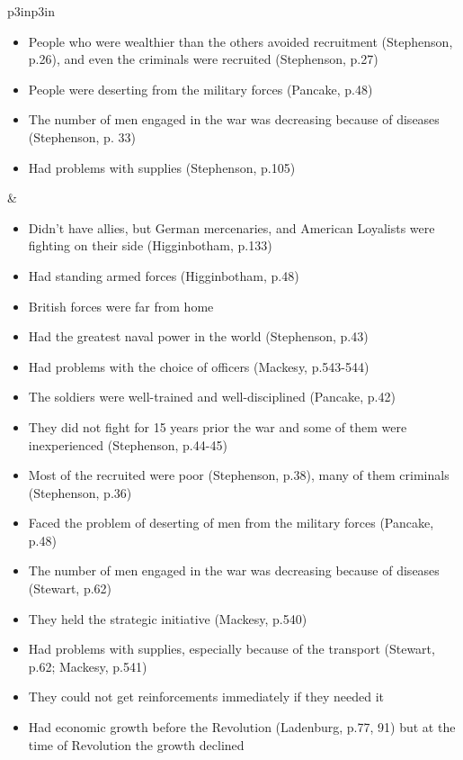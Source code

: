 \begin{singlespace}
\begin{mpxtabular}{p{3in}p{3in}}
\begin{itemize}[nolistsep,leftmargin=*]
	    \item  People who were wealthier than the others avoided recruitment (Stephenson, p.26), and even the criminals were recruited (Stephenson, p.27) 
	    \item  People were deserting from the military forces (Pancake, p.48) 
	    \item  The number of men engaged in the war was decreasing because of diseases (Stephenson, p. 33) 
	    \item  Had problems with supplies (Stephenson, p.105)
	\end{itemize}
	&
	\begin{itemize}[nolistsep,leftmargin=*]
	    \item  Didn’t have allies, but German mercenaries, and American Loyalists were fighting on their side (Higginbotham, p.133) 
	    \item  Had standing armed forces (Higginbotham, p.48) 
	    \item  British forces were far from home 
	    \item  Had the greatest naval power in the world (Stephenson, p.43) 
	    \item  Had problems with the choice of officers (Mackesy, p.543-544) 
	    \item  The soldiers were well-trained and well-disciplined (Pancake, p.42) 
	    \item  They did not fight for 15 years prior the war and some of them were inexperienced (Stephenson, p.44-45) 
	    \item  Most of the recruited were poor (Stephenson, p.38), many of them criminals (Stephenson, p.36) 
	    \item  Faced the problem of deserting of men from the military forces (Pancake, p.48) 
	    \item  The number of men engaged in the war was decreasing because of diseases (Stewart, p.62) 
	    \item  They held the strategic initiative (Mackesy, p.540) 
	    \item  Had problems with supplies, especially because of the transport (Stewart, p.62; Mackesy, p.541) 
	    \item  They could not get reinforcements immediately if they needed it
	\end{itemize}\ML
	\ML
	\begin{itemize}[nolistsep,leftmargin=*]
	     \item Had economic growth before the Revolution (Ladenburg, p.77, 91) but at the time of Revolution the growth declined

\end{itemize}
\end{mpxtabular}
\end{singlespace}
